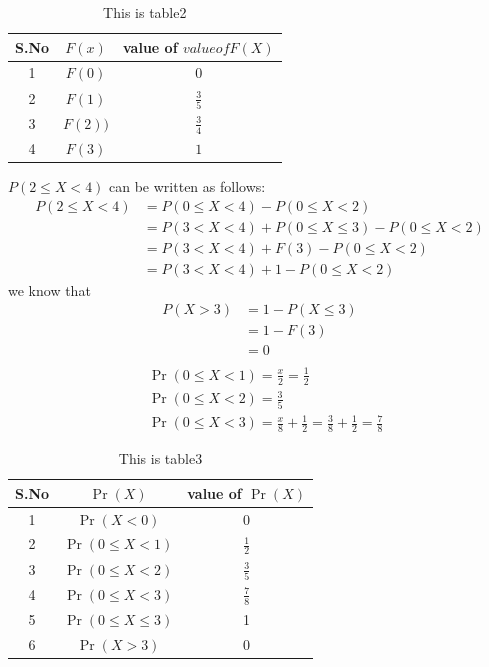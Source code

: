 \documentclass[journal,12pt,twocolumn]{IEEEtran}
\begin{document}
\begin{table}[h!]
\resizebox{9.5cm}{!}
{ 
\begin{tabular}{|c|c|c|}
\hline
S.No & $F(x)$  & value of $value of F(X)$\\
\hline
1 & $F(0)$ & $0$ \\
\hline
2 & $F(1)$ & $\frac{3}{5}$ \\
\hline
3 &  $F(2))$ & $\frac{3}{4}$ \\
\hline
4 & $F(3)$ & $1$ \\
\hline
\end{tabular} 
}
\caption{This is table2}
\label{table:2}
\end{table}

$P(2 \leq X <4) $ can be written as follows:
\begin{align}
P(2 \leq X <4) &= P(0 \leq X < 4) - P(0 \leq X <2)\\
&= P(3<X<4) + P(0 \leq X \leq 3)  - P(0 \leq X <2) \\
&=  P(3<X<4) + F(3)  - P(0 \leq X <2) \\
&=  P(3<X<4) + 1  - P(0 \leq X <2) \label{2}
\end{align}
we know that 
\begin{align}
P(X>3)&=1-P(X \leq 3)\\
&=1-F(3)\\
&=0 \label{3} \\
\end{align}
\begin{align}
& \Pr(0 \leq X<1) = \frac{x}{2} = \frac{1}{2} \\
& \Pr(0 \leq X<2 ) = \frac{3}{5} \label{4} \\
& \Pr(0 \leq X< 3) = \frac{x}{8} + \frac{1}{2} = \frac{3}{8}+ \frac{1}{2} = 
\frac{7}{8}
\end{align}

\begin{table}[h!]
\resizebox{9.5cm}{!}
{ 
\begin{tabular}{|c|c|c|}
\hline
S.No & $\Pr(X)$  & value of $\Pr(X)$\\
\hline
1 & $\Pr(X<0)$ & 0 \\
\hline
2 & $\Pr(0 \leq X<1)$ & $\frac{1}{2}$ \\
\hline
3 & $\Pr(0 \leq X<2 )$ & $\frac{3}{5}$ \\
\hline
4 &  $\Pr(0 \leq X< 3)$ & $\frac{7}{8}$ \\
\hline
5 & $\Pr(0 \leq X \leq 3)$ & 1 \\
\hline
6 & $\Pr(X>3)$ & 0 \\
\hline
\end{tabular} 
}
\caption{This is table3}
\label{table:3}
\end{table}
\end{document}
